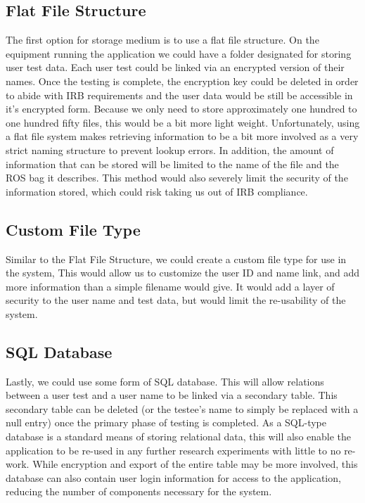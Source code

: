 \documentclass[onecolumn, draftclsnofoot,10pt, compsoc]{report}
\begin{document}
\subsection{Flat File Structure}
The first option for storage medium is to use a flat file structure. On the equipment running the application we could have a folder designated for storing user test data. Each user test could be linked via an encrypted version of their names. Once the testing is complete, the encryption key could be deleted in order to abide with IRB requirements and the user data would be still be accessible in it's encrypted form. Because we only need to store approximately one hundred to one hundred fifty files, this would be a bit more light weight. Unfortunately, using a flat file system makes retrieving information to be a bit more involved as a very strict naming structure to prevent lookup errors. In addition, the amount of information that can be stored will be limited to the name of the file and the ROS bag it describes. This method would also severely limit the security of the information stored, which could risk taking us out of IRB compliance. 
\subsection{Custom File Type}
Similar to the Flat File Structure, we could create a custom file type for use in the system, This would allow us to customize the user ID and name link, and add more information than a simple filename would give. It would add a layer of security to the user name and test data, but would limit the re-usability of the system. 
\subsection{SQL Database}
Lastly, we could use some form of SQL database. This will allow relations between a user test and a user name to be linked via a secondary table. This secondary table can be deleted (or the testee's name to simply be replaced with a null entry) once the primary phase of testing is completed. As a SQL-type database is a standard means of storing relational data, this will also enable the application to be re-used in any further research experiments with little to no re-work. While encryption and export of the entire table may be more involved, this database can also contain user login information for access to the application, reducing the number of components necessary for the system.
\end{document}
